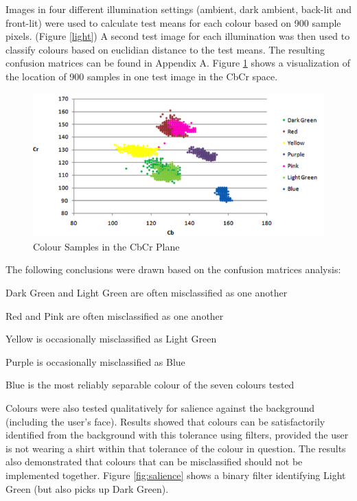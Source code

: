 \documentclass[12pt]{article}
\begin{document}
Images in four different illumination settings (ambient, dark ambient, back-lit and front-lit) were used to calculate test means for each colour based on 900 sample pixels. (Figure \ref{light}) A second test image for each illumination was then used to classify colours based on euclidian distance to the test means. The resulting confusion matrices can be found in Appendix A. Figure \ref{fig:YUVTest} shows a visualization of the location of 900 samples in one test image in the CbCr space. 

\begin{figure}[h]
  \centering
  \includegraphics[scale=1]{YUVTest.png}
  \caption{Colour Samples in the CbCr Plane}
  \label{fig:YUVTest}
\end{figure}

The following conclusions were drawn based on the confusion matrices analysis: 
\begin{enumerate*}
	\item Dark Green and Light Green are often misclassified as one another 
	\item Red and Pink are often misclassified as one another
	\item Yellow is occasionally misclassified as Light Green
	\item Purple is occasionally misclassified as Blue
	\item Blue is the most reliably separable colour of the seven colours tested
\end{enumerate*}

Colours were also tested qualitatively for salience against the background (including the user’s face). Results showed that colours can be satisfactorily identified from the background with this tolerance using filters, provided the user is not wearing a shirt within that tolerance of the colour in question. The results also demonstrated that colours that can be misclassified should not be implemented together. Figure \ref{fig:salience} shows a binary filter identifying Light Green (but also picks up Dark Green). 
\end{document}
